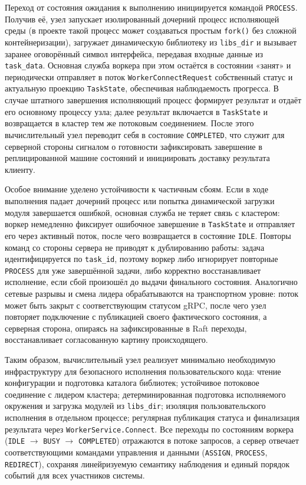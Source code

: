 Переход от состояния ожидания к выполнению инициируется командой
\texttt{PROCESS}. Получив её, узел запускает изолированный дочерний процесс
исполняющей среды (в проекте такой процесс может создаваться простым
\texttt{fork()} без сложной контейнеризации), загружает динамическую библиотеку
из \texttt{libs\_dir} и вызывает заранее оговорённый символ интерфейса,
передавая входные данные из \texttt{task\_data}. Основная служба воркера при
этом остаётся в состоянии «занят» и периодически отправляет в поток
\texttt{WorkerConnectRequest} собственный статус и актуальную проекцию
\texttt{TaskState}, обеспечивая наблюдаемость прогресса. В случае штатного
завершения исполняющий процесс формирует результат и отдаёт его основному
процессу узла; далее результат включается в \texttt{TaskState} и возвращается в
кластер тем же потоковым соединением. После этого вычислительный узел переводит
себя в состояние \texttt{COMPLETED}, что служит для серверной стороны сигналом
о готовности зафиксировать завершение в реплицированной машине состояний и
инициировать доставку результата клиенту.

Особое внимание уделено устойчивости к частичным сбоям. Если в ходе выполнения
падает дочерний процесс или попытка динамической загрузки модуля завершается
ошибкой, основная служба не теряет связь с кластером: воркер немедленно
фиксирует ошибочное завершение в \texttt{TaskState} и отправляет его через
активный поток, после чего возвращается в состояние \texttt{IDLE}. Повторы
команд со стороны сервера не приводят к дублированию работы: задача
идентифицируется по \texttt{task\_id}, поэтому воркер либо игнорирует повторные
\texttt{PROCESS} для уже завершённой задачи, либо корректно восстанавливает
исполнение, если сбой произошёл до выдачи финального состояния. Аналогично
сетевые разрывы и смена лидера обрабатываются на транспортном уровне: поток
может быть закрыт с соответствующим статусом gRPC, после чего узел повторяет
подключение с публикацией своего фактического состояния, а серверная сторона,
опираясь на зафиксированные в Raft переходы, восстанавливает согласованную
картину происходящего.

Таким образом, вычислительный узел реализует минимально необходимую
инфраструктуру для безопасного исполнения пользовательского кода: чтение
конфигурации и подготовка каталога библиотек; устойчивое потоковое соединение с
лидером кластера; детерминированная подготовка исполняемого окружения и
загрузка модулей из \texttt{libs\_dir}; изоляция пользовательского исполнения в
отдельном процессе; регулярная публикация статуса и финализация результата
через \texttt{WorkerService.Connect}. Все переходы по состояниям воркера
(\texttt{IDLE} $\rightarrow$ \texttt{BUSY} $\rightarrow$ \texttt{COMPLETED})
отражаются в потоке запросов, а сервер отвечает соответствующими командами
управления и данными (\texttt{ASSIGN}, \texttt{PROCESS}, \texttt{REDIRECT}),
сохраняя линейризуемую семантику наблюдения и единый порядок событий для всех
участников системы.
